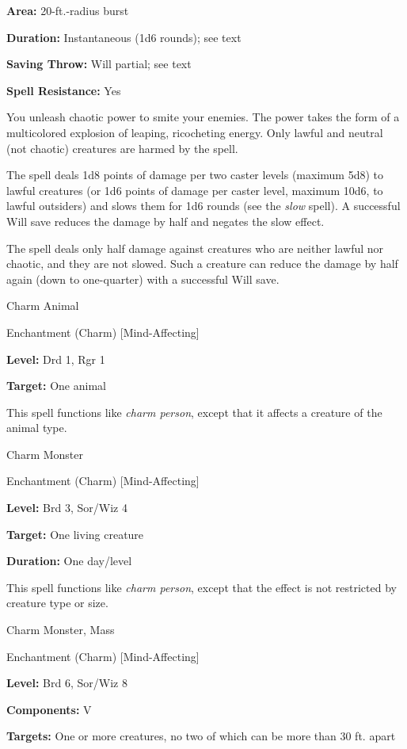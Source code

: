 \documentclass{article}
\begin{document}
\textbf{Area:} 20-ft.-radius burst

\textbf{Duration:} Instantaneous (1d6 rounds); see text

\textbf{Saving Throw: }Will partial; see text

\textbf{Spell Resistance:} Yes

You unleash chaotic power to smite your enemies. The power takes the form of a 
multicolored explosion of leaping, ricocheting energy. Only lawful and neutral 
(not chaotic) creatures are harmed by the spell.

The spell deals 1d8 points of damage per two caster levels (maximum 5d8) to lawful 
creatures (or 1d6 points of damage per caster level, maximum 10d6, to lawful outsiders) 
and slows them for 1d6 rounds (see the \textit{slow} spell). A successful Will 
save reduces the damage by half and negates the slow effect.

The spell deals only half damage against creatures who are neither lawful nor chaotic, 
and they are not slowed. Such a creature can reduce the damage by half again (down 
to one-quarter) with a successful Will save.

\vspace{12pt}
Charm Animal

Enchantment (Charm) [Mind-Affecting]

\textbf{Level:} Drd 1, Rgr 1

\textbf{Target:} One animal

This spell functions like \textit{charm person}, except that it affects a creature 
of the animal type.

\vspace{12pt}
Charm Monster

Enchantment (Charm) [Mind-Affecting]

\textbf{Level:} Brd 3, Sor/Wiz 4

\textbf{Target:} One living creature

\textbf{Duration:} One day/level

This spell functions like \textit{charm person}, except that the effect is not 
restricted by creature type or size.

\vspace{12pt}
Charm Monster, Mass

Enchantment (Charm) [Mind-Affecting]

\textbf{Level:} Brd 6, Sor/Wiz 8

\textbf{Components:} V

\textbf{Targets:} One or more creatures, no two of which can be more than 30 ft. 
apart
\end{document}
